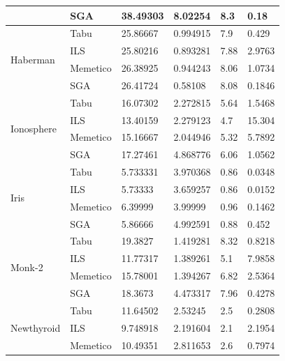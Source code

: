\documentclass[11pt]{article}
\begin{document}
\begin{table}[h]
{\begin{tabular}{ |l|l|l|l|l|l| }
                             & SGA      & 38.49303   & 8.02254      &  8.3    & 0.18\\ \hline
    \multirow{4}{*}{Haberman}   & Tabu     & 25.86667   & 0.994915     &  7.9    & 0.429 \\
                                & ILS      & 25.80216   & 0.893281     &  7.88   & 2.9763 \\
                                & Memetico & 26.38925   & 0.944243     &  8.06   & 1.0734 \\
                                & SGA      & 26.41724   & 0.58108      &  8.08   & 0.1846\\ \hline
    \multirow{4}{*}{Ionosphere}   & Tabu     & 16.07302   & 2.272815     &  5.64   & 1.5468 \\
                                  & ILS      & 13.40159   & 2.279123     &  4.7    & 15.304 \\
                                  & Memetico & 15.16667   & 2.044946     &  5.32   & 5.7892 \\
                                  & SGA      & 17.27461   & 4.868776     &  6.06   & 1.0562\\ \hline
    \multirow{4}{*}{Iris}   & Tabu     & 5.733331   & 3.970368     &  0.86   & 0.0348 \\
                            & ILS      & 5.73333    & 3.659257     &  0.86   & 0.0152 \\
                            & Memetico & 6.39999    & 3.99999      &  0.96   & 0.1462 \\
                            & SGA      & 5.86666    & 4.992591     &  0.88   & 0.452\\ \hline
    \multirow{4}{*}{Monk-2}   & Tabu     & 19.3827    & 1.419281     &  8.32   & 0.8218 \\
                              & ILS      & 11.77317   & 1.389261     &  5.1    & 7.9858 \\
                              & Memetico & 15.78001   & 1.394267     &  6.82   & 2.5364 \\
                              & SGA      & 18.3673    & 4.473317     &  7.96   & 0.4278\\ \hline
    \multirow{4}{*}{Newthyroid}   & Tabu     & 11.64502   & 2.53245      &  2.5    & 0.2808 \\
                                  & ILS      & 9.748918   & 2.191604     &  2.1    & 2.1954 \\
                                  & Memetico & 10.49351   & 2.811653     &  2.6    & 0.7974 \\

\end{tabular}}
\end{table}
\end{document}
